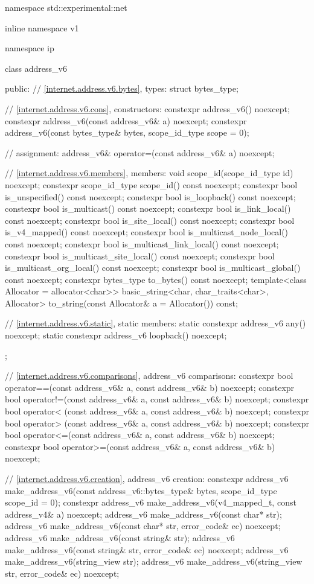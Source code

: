 %
\begin{codeblock}
namespace std::experimental::net {
inline namespace v1 {
namespace ip {

  class address_v6
  {
  public:
    // \ref{internet.address.v6.bytes}, types:
    struct bytes_type;

    // \ref{internet.address.v6.cons}, constructors:
    constexpr address_v6() noexcept;
    constexpr address_v6(const address_v6& a) noexcept;
    constexpr address_v6(const bytes_type& bytes,
                         scope_id_type scope = 0);

    // assignment:
    address_v6& operator=(const address_v6& a) noexcept;

    // \ref{internet.address.v6.members}, members:
    void scope_id(scope_id_type id) noexcept;
    constexpr scope_id_type scope_id() const noexcept;
    constexpr bool is_unspecified() const noexcept;
    constexpr bool is_loopback() const noexcept;
    constexpr bool is_multicast() const noexcept;
    constexpr bool is_link_local() const noexcept;
    constexpr bool is_site_local() const noexcept;
    constexpr bool is_v4_mapped() const noexcept;
    constexpr bool is_multicast_node_local() const noexcept;
    constexpr bool is_multicast_link_local() const noexcept;
    constexpr bool is_multicast_site_local() const noexcept;
    constexpr bool is_multicast_org_local() const noexcept;
    constexpr bool is_multicast_global() const noexcept;
    constexpr bytes_type to_bytes() const noexcept;
    template<class Allocator = allocator<char>>
      basic_string<char, char_traits<char>, Allocator>
        to_string(const Allocator& a = Allocator()) const;

    // \ref{internet.address.v6.static}, static members:
    static constexpr address_v6 any() noexcept;
    static constexpr address_v6 loopback() noexcept;
  };

  // \ref{internet.address.v6.comparisons}, address_v6 comparisons:
  constexpr bool operator==(const address_v6& a, const address_v6& b) noexcept;
  constexpr bool operator!=(const address_v6& a, const address_v6& b) noexcept;
  constexpr bool operator< (const address_v6& a, const address_v6& b) noexcept;
  constexpr bool operator> (const address_v6& a, const address_v6& b) noexcept;
  constexpr bool operator<=(const address_v6& a, const address_v6& b) noexcept;
  constexpr bool operator>=(const address_v6& a, const address_v6& b) noexcept;

  // \ref{internet.address.v6.creation}, address_v6 creation:
  constexpr address_v6 make_address_v6(const address_v6::bytes_type& bytes,
                                       scope_id_type scope_id = 0);
  constexpr address_v6 make_address_v6(v4_mapped_t, const address_v4& a) noexcept;
  address_v6 make_address_v6(const char* str);
  address_v6 make_address_v6(const char* str, error_code& ec) noexcept;
  address_v6 make_address_v6(const string& str);
  address_v6 make_address_v6(const string& str, error_code& ec) noexcept;
  address_v6 make_address_v6(string_view str);
  address_v6 make_address_v6(string_view str, error_code& ec) noexcept;

}}}
\end{codeblock}
